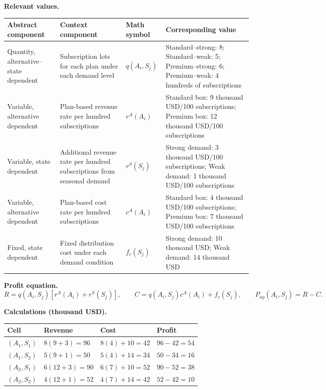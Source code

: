 {		\textbf{Relevant values.}
		\begin{center}
			\small
			\begin{tabularx}{\textwidth}{
					>{\raggedright\arraybackslash}X
					>{\raggedright\arraybackslash}X
					>{\centering\arraybackslash}p{}
					>{\raggedright\arraybackslash}X
				}
				\toprule
				Abstract component & Context component & Math symbol & Corresponding value \\
				\midrule
				Quantity, alternative--state dependent
				& Subscription lots for each plan under each demand level
				& $q(A_i,S_j)$
				& Standard--strong: 8; Standard--weak: 5; Premium--strong: 6; Premium--weak: 4 hundreds of subscriptions \\
				Variable, alternative dependent
				& Plan-based revenue rate per hundred subscriptions
				& $r^A(A_i)$
				& Standard box: 9 thousand USD/100 subscriptions; Premium box: 12 thousand USD/100 subscriptions \\
				Variable, state dependent
				& Additional revenue rate per hundred subscriptions from seasonal demand
				& $r^S(S_j)$
				& Strong demand: 3 thousand USD/100 subscriptions; Weak demand: 1 thousand USD/100 subscriptions \\
				Variable, alternative dependent
				& Plan-based cost rate per hundred subscriptions
				& $c^A(A_i)$
				& Standard box: 4 thousand USD/100 subscriptions; Premium box: 7 thousand USD/100 subscriptions \\
				Fixed, state dependent
				& Fixed distribution cost under each demand condition
				& $f_c(S_j)$
				& Strong demand: 10 thousand USD; Weak demand: 14 thousand USD \\
				\bottomrule
			\end{tabularx}
		\end{center}
		
		\textbf{Profit equation.}
		\[
		R=q(A_i,S_j)\left[r^A(A_i)+r^S(S_j)\right],
		\qquad
		C=q(A_i,S_j)c^A(A_i)+f_c(S_j),
		\qquad
		P_{ay}(A_i,S_j)=R-C.
		\]
		
		\textbf{Calculations (thousand USD).}
		\begin{center}
			\small
			\begin{tabularx}{\textwidth}{
					>{\raggedright\arraybackslash}X
					>{\centering\arraybackslash}X
					>{\centering\arraybackslash}X
					>{\centering\arraybackslash}X
				}
				\toprule
				Cell & Revenue & Cost & Profit \\
				\midrule
				$(A_1,S_1)$ & $8(9+3)=96$ & $8(4)+10=42$ & $96-42=54$ \\
				$(A_1,S_2)$ & $5(9+1)=50$ & $5(4)+14=34$ & $50-34=16$ \\
				$(A_2,S_1)$ & $6(12+3)=90$ & $6(7)+10=52$ & $90-52=38$ \\
				$(A_2,S_2)$ & $4(12+1)=52$ & $4(7)+14=42$ & $52-42=10$ \\
				\bottomrule
			\end{tabularx}
		\end{center}
		
}
